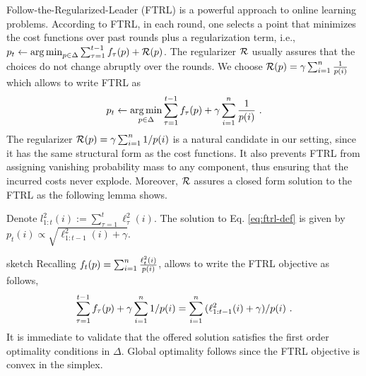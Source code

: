 Follow-the-Regularized-Leader (FTRL) is a  powerful approach to online learning problems. According to FTRL, in each round, one selects a point that minimizes the cost functions over past rounds plus a regularization term, i.e., $p_t \gets \operatorname*{arg\,min}_{p\in\Delta} \sum_{\tau=1}^{t-1} f_\tau(p) + \mathcal{R}(p)$. The  regularizer $\mathcal{R}$ usually assures that the choices do not change abruptly over the rounds. We choose \linebreak  $\mathcal{R}(p) =\gamma \sum_{i=1}^n \frac{1}{p(i)}$ which allows to write   FTRL  as   
\begin{equation} \label{eq:ftrl-def}
 p_t \gets \operatorname*{arg\,min}_{p\in\Delta} \sum_{\tau=1}^{t-1}f_\tau(p)  + \gamma \sum_{i=1}^n \frac{1}{p(i)}
~.
\end{equation}
The regularizer $\mathcal{R}(p)=\gamma \sum_{i=1}^n {1}/{p(i)}$ is a natural candidate in our setting, since
it has the same structural form as the cost functions. It also prevents FTRL from assigning vanishing probability mass to any component, thus ensuring that the incurred costs never explode. Moreover, $\mathcal{R}$
assures a closed form  solution to the FTRL as the following lemma shows. 
%
%
\begin{lemma} \label{lemma:ftrl-sol}
Denote $l_{1:t}^2(i):=\sum_{\tau=1}^{t}\ell_\tau^2(i)$. The solution to Eq. \eqref{eq:ftrl-def} is given by $p_t(i) \propto \sqrt{\ell_{1:t-1}^2(i)+\gamma}$. 
\end{lemma}
\begin{proofarg}{sketch}
Recalling  $f_t(p) = \sum_{i=1}^n \frac{\ell_t^2(i)}{p(i)}$, allows to 
write the FTRL objective  as follows,  
$$\sum_{\tau=1}^{t-1} f_\tau(p)  + \gamma \sum_{i=1}^n {1}/{p(i)}
  = \sum_{i=1}^n {(\ell_{1:t-1}^2(i) +\gamma)}/{p(i)}~.$$
It is immediate to validate that the offered solution satisfies the first order optimality conditions in $\Delta$.
Global optimality follows since the FTRL objective is convex in the simplex.
\end{proofarg}

